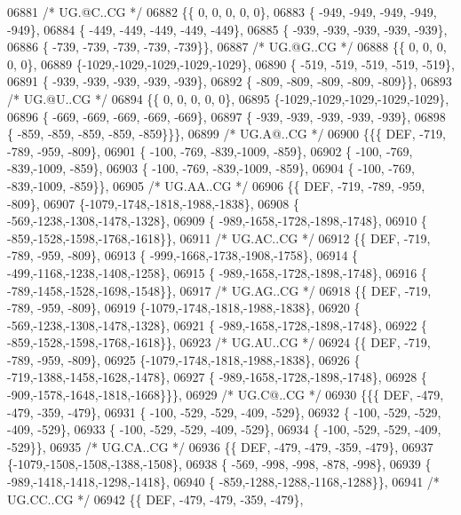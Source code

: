 \begin{DoxyCode}
06881 \textcolor{comment}{/* UG.@C..CG */}
06882 \{\{    0,    0,    0,    0,    0\},
06883 \{ -949, -949, -949, -949, -949\},
06884 \{ -449, -449, -449, -449, -449\},
06885 \{ -939, -939, -939, -939, -939\},
06886 \{ -739, -739, -739, -739, -739\}\},
06887 \textcolor{comment}{/* UG.@G..CG */}
06888 \{\{    0,    0,    0,    0,    0\},
06889 \{-1029,-1029,-1029,-1029,-1029\},
06890 \{ -519, -519, -519, -519, -519\},
06891 \{ -939, -939, -939, -939, -939\},
06892 \{ -809, -809, -809, -809, -809\}\},
06893 \textcolor{comment}{/* UG.@U..CG */}
06894 \{\{    0,    0,    0,    0,    0\},
06895 \{-1029,-1029,-1029,-1029,-1029\},
06896 \{ -669, -669, -669, -669, -669\},
06897 \{ -939, -939, -939, -939, -939\},
06898 \{ -859, -859, -859, -859, -859\}\}\},
06899 \textcolor{comment}{/* UG.A@..CG */}
06900 \{\{\{  DEF, -719, -789, -959, -809\},
06901 \{ -100, -769, -839,-1009, -859\},
06902 \{ -100, -769, -839,-1009, -859\},
06903 \{ -100, -769, -839,-1009, -859\},
06904 \{ -100, -769, -839,-1009, -859\}\},
06905 \textcolor{comment}{/* UG.AA..CG */}
06906 \{\{  DEF, -719, -789, -959, -809\},
06907 \{-1079,-1748,-1818,-1988,-1838\},
06908 \{ -569,-1238,-1308,-1478,-1328\},
06909 \{ -989,-1658,-1728,-1898,-1748\},
06910 \{ -859,-1528,-1598,-1768,-1618\}\},
06911 \textcolor{comment}{/* UG.AC..CG */}
06912 \{\{  DEF, -719, -789, -959, -809\},
06913 \{ -999,-1668,-1738,-1908,-1758\},
06914 \{ -499,-1168,-1238,-1408,-1258\},
06915 \{ -989,-1658,-1728,-1898,-1748\},
06916 \{ -789,-1458,-1528,-1698,-1548\}\},
06917 \textcolor{comment}{/* UG.AG..CG */}
06918 \{\{  DEF, -719, -789, -959, -809\},
06919 \{-1079,-1748,-1818,-1988,-1838\},
06920 \{ -569,-1238,-1308,-1478,-1328\},
06921 \{ -989,-1658,-1728,-1898,-1748\},
06922 \{ -859,-1528,-1598,-1768,-1618\}\},
06923 \textcolor{comment}{/* UG.AU..CG */}
06924 \{\{  DEF, -719, -789, -959, -809\},
06925 \{-1079,-1748,-1818,-1988,-1838\},
06926 \{ -719,-1388,-1458,-1628,-1478\},
06927 \{ -989,-1658,-1728,-1898,-1748\},
06928 \{ -909,-1578,-1648,-1818,-1668\}\}\},
06929 \textcolor{comment}{/* UG.C@..CG */}
06930 \{\{\{  DEF, -479, -479, -359, -479\},
06931 \{ -100, -529, -529, -409, -529\},
06932 \{ -100, -529, -529, -409, -529\},
06933 \{ -100, -529, -529, -409, -529\},
06934 \{ -100, -529, -529, -409, -529\}\},
06935 \textcolor{comment}{/* UG.CA..CG */}
06936 \{\{  DEF, -479, -479, -359, -479\},
06937 \{-1079,-1508,-1508,-1388,-1508\},
06938 \{ -569, -998, -998, -878, -998\},
06939 \{ -989,-1418,-1418,-1298,-1418\},
06940 \{ -859,-1288,-1288,-1168,-1288\}\},
06941 \textcolor{comment}{/* UG.CC..CG */}
06942 \{\{  DEF, -479, -479, -359, -479\},

\end{DoxyCode}
